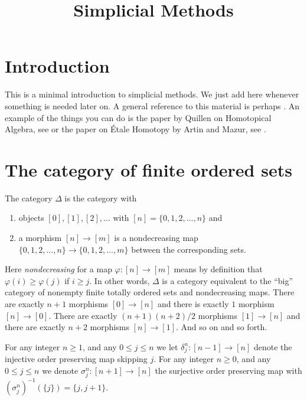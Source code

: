 

%


\title{Simplicial Methods}


\maketitle

\label{section-phantom}

\tableofcontents

\section{Introduction}
\label{section-introduction}

\noindent
This is a minimal introduction to simplicial methods.
We just add here whenever something is needed later on.
A general reference to this material is perhaps \cite{SimpHom}.
An example of the things you can do is the paper
by Quillen on Homotopical Algebra, see \cite{Quillen}
or the paper on \'Etale Homotopy by Artin and Mazur, see \cite{ArtinMazur}.

\section{The category of finite ordered sets}
\label{section-Delta}

\noindent
The category $\Delta$ is the category with
\begin{enumerate}
\item objects $[0], [1], [2], \ldots$ with
$[n] = \{0, 1, 2, \ldots, n\}$ and
\item a morphism $[n] \to [m]$ is a nondecreasing map
$\{0, 1, 2, \ldots, n\} \to \{0, 1, 2, \ldots, m\}$
between the corresponding sets.
\end{enumerate}
Here {\it nondecreasing} for a map $\varphi : [n] \to [m]$
means by definition that $\varphi(i) \geq \varphi(j)$ if $i \geq j$.
In other words, $\Delta$ is a category equivalent to the
``big'' category of nonempty finite totally ordered sets and nondecreasing maps.
There are exactly $n + 1$ morphisms $[0] \to [n]$ and
there is exactly $1$ morphism $[n] \to [0]$. There are
exactly $(n + 1)(n + 2)/2$ morphisms $[1] \to [n]$ and there are
exactly $n + 2$ morphisms $[n] \to [1]$. And so on and so forth.

\begin{definition}
\label{definition-face-degeneracy}
For any integer $n\geq 1$, and any $0\leq j \leq n$ we let
{\it $\delta^n_j : [n-1] \to [n]$}
denote the injective order preserving map skipping $j$. For any
integer $n\geq 0$, and any $0\leq j \leq n$ we denote
{\it $\sigma^n_j : [n + 1]  \to [n]$}
the surjective order preserving map with
$(\sigma^n_j)^{-1}(\{j\}) = \{j, j + 1\}$.
\end{definition}

